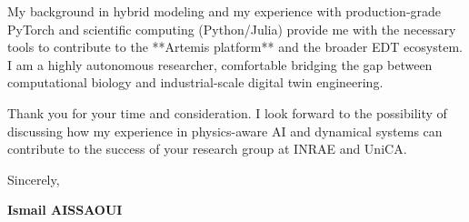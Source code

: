 \documentclass[a4paper,12pt]{article}
\begin{document}
My background in hybrid modeling and my experience with production-grade PyTorch and scientific computing (Python/Julia) provide me with the necessary tools to contribute to the **Artemis platform** and the broader EDT ecosystem. I am a highly autonomous researcher, comfortable bridging the gap between computational biology and industrial-scale digital twin engineering.

Thank you for your time and consideration. I look forward to the possibility of discussing how my experience in physics-aware AI and dynamical systems can contribute to the success of your research group at INRAE and UniCA.

Sincerely,

\bigskip

\textbf{Ismail AISSAOUI}
\end{document}
